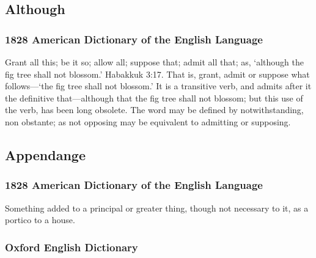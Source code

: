 	\subsection{Although} %
		\label{ALTHOUGH}
		
		\subsubsection{1828 American Dictionary of the English Language}
		
			\begin{compactitem}
				\item Grant all this; be it so; allow all; suppose that; admit all that; as, `although the fig tree shall not blossom.' Habakkuk 3:17. That is, grant, admit or suppose what follows---`the fig tree shall not blossom.' It is a transitive verb, and admits after it the definitive that---although that the fig tree shall not blossom; but this use of the verb, has been long obsolete. The word may be defined by notwithstanding, non obstante; as not opposing may be equivalent to admitting or supposing.
			\end{compactitem}
			
	\subsection{Appendange} %
		\label{APPENDAGE}
		
		\subsubsection{1828 American Dictionary of the English Language}
		
			\begin{compactitem}
				\item Something added to a principal or greater thing, though not necessary to it, as a portico to a house.
			\end{compactitem}
		
		\subsubsection{Oxford English Dictionary}
		
